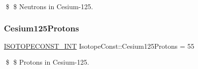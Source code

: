 \$ \$ Neutrons in Cesium-\/125. \mbox{\label{group___isotope_const-_cesium-_cs125_ga6a70b7c4d3b765e9a30f5e7ced1350d4}} 
\subsubsection{\texorpdfstring{Cesium125\+Protons}{Cesium125Protons}}
{\footnotesize\ttfamily \mbox{\hyperlink{group___isotope_const-_macros_ga5f18360b3e99483a35c32d789e62621c}{I\+S\+O\+T\+O\+P\+E\+C\+O\+N\+S\+T\+\_\+\+I\+NT}} Isotope\+Const\+::\+Cesium125\+Protons = 55}

\$ \$ Protons in Cesium-\/125. 
